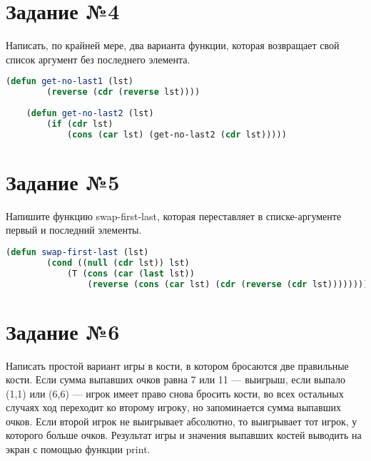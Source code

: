 \section{Задание №4}

Написать, по крайней мере, два варианта функции, которая возвращает
свой список аргумент без последнего элемента.

\begin{lstlisting}[language=Lisp]
	(defun get-no-last1 (lst)
		(reverse (cdr (reverse lst))))
		
	(defun get-no-last2 (lst)
		(if (cdr lst)
			(cons (car lst) (get-no-last2 (cdr lst)))))
\end{lstlisting}

\section{Задание №5}

Напишите функцию swap-first-last, которая переставляет в списке-аргументе первый и последний элементы.

\begin{lstlisting}[language=Lisp]
	(defun swap-first-last (lst)
		(cond ((null (cdr lst)) lst)
			(T (cons (car (last lst))
				(reverse (cons (car lst) (cdr (reverse (cdr lst)))))))))
\end{lstlisting}

\section{Задание №6}

Написать простой вариант игры в кости, в котором бросаются две
правильные кости. Если сумма выпавших очков равна 7 или 11 —
выигрыш, если выпало (1,1) или (6,6) — игрок имеет право снова
бросить кости, во всех остальных случаях ход переходит ко второму
игроку, но запоминается сумма выпавших очков. Если второй игрок не
выигрывает абсолютно, то выигрывает тот игрок, у которого больше
очков. Результат игры и значения выпавших костей выводить на экран с
помощью функции print.

